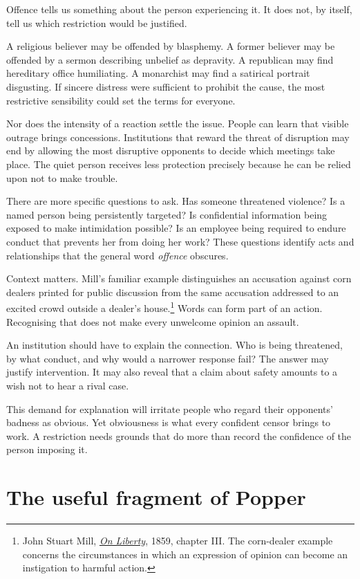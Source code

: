 \documentclass[12pt,a4paper]{book}
\begin{document}
Offence tells us something about the person experiencing it. It does not, by itself, tell us which restriction would be justified.

A religious believer may be offended by blasphemy. A former believer may be offended by a sermon describing unbelief as depravity. A republican may find hereditary office humiliating. A monarchist may find a satirical portrait disgusting. If sincere distress were sufficient to prohibit the cause, the most restrictive sensibility could set the terms for everyone.

Nor does the intensity of a reaction settle the issue. People can learn that visible outrage brings concessions. Institutions that reward the threat of disruption may end by allowing the most disruptive opponents to decide which meetings take place. The quiet person receives less protection precisely because he can be relied upon not to make trouble.

There are more specific questions to ask. Has someone threatened violence? Is a named person being persistently targeted? Is confidential information being exposed to make intimidation possible? Is an employee being required to endure conduct that prevents her from doing her work? These questions identify acts and relationships that the general word \emph{offence} obscures.

Context matters. Mill's familiar example distinguishes an accusation against corn dealers printed for public discussion from the same accusation addressed to an excited crowd outside a dealer's house.\footnote{John Stuart Mill, \href{https://www.gutenberg.org/files/34901/34901-h/34901-h.htm}{\emph{On Liberty}}, 1859, chapter III. The corn-dealer example concerns the circumstances in which an expression of opinion can become an instigation to harmful action.} Words can form part of an action. Recognising that does not make every unwelcome opinion an assault.

An institution should have to explain the connection. Who is being threatened, by what conduct, and why would a narrower response fail? The answer may justify intervention. It may also reveal that a claim about safety amounts to a wish not to hear a rival case.

This demand for explanation will irritate people who regard their opponents' badness as obvious. Yet obviousness is what every confident censor brings to work. A restriction needs grounds that do more than record the confidence of the person imposing it.

\section*{The useful fragment of Popper}
\end{document}
